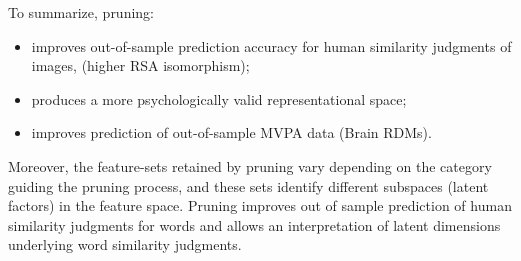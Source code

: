 To summarize, pruning:
\begin{itemize}
    \item improves out-of-sample prediction accuracy for human similarity judgments of images, (higher RSA isomorphism);
    \item produces a more psychologically valid representational space;
    \item improves prediction of out-of-sample MVPA data (Brain RDMs).
\end{itemize}
Moreover, the feature-sets retained by pruning vary depending on the category guiding the pruning process, and these sets identify different subspaces (latent factors) in the feature space.
Pruning improves out of sample prediction of human similarity judgments for words and allows an interpretation of latent dimensions underlying word similarity judgments.

